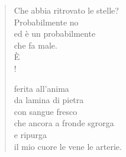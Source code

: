 
\begin{verse}
    Che abbia ritrovato le stelle?\\
    Probabilmente no\\
    ed è un probabilmente\\
    che fa male.\\
    È\\!

    ferita all'anima\\
    da lamina di pietra\\
    con sangue fresco\\
    che ancora a fronde sgrorga\\
    e ripurga\\
    il mio cuore le vene le arterie.
\end{verse}